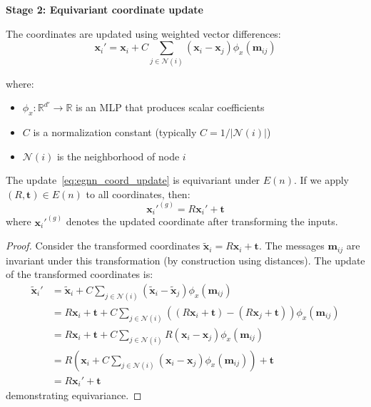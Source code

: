 \textbf{Stage 2: Equivariant coordinate update}

The coordinates are updated using weighted vector differences:
\begin{equation}\label{eq:egnn_coord_update}
\mathbf{x}_i' = \mathbf{x}_i + C \sum_{j \in \mathcal{N}(i)} (\mathbf{x}_i - \mathbf{x}_j) \phi_x(\mathbf{m}_{ij})
\end{equation}

where:
\begin{itemize}
    \item $\phi_x: \mathbb{R}^{d'} \to \mathbb{R}$ is an MLP that produces scalar coefficients
    \item $C$ is a normalization constant (typically $C = 1/|\mathcal{N}(i)|$)
    \item $\mathcal{N}(i)$ is the neighborhood of node $i$
\end{itemize}

\begin{proposition}\label{prop:egnn_coord_equivariance}
The update~\eqref{eq:egnn_coord_update} is equivariant under $E(n)$. If we apply $(R, \mathbf{t}) \in E(n)$ to all coordinates, then:
\begin{equation}
\mathbf{x}_i'^{(g)} = R\mathbf{x}_i' + \mathbf{t}
\end{equation}
where $\mathbf{x}_i'^{(g)}$ denotes the updated coordinate after transforming the inputs.
\end{proposition}

\begin{proof}
Consider the transformed coordinates $\tilde{\mathbf{x}}_i = R\mathbf{x}_i + \mathbf{t}$. The messages $\mathbf{m}_{ij}$ are invariant under this transformation (by construction using distances). The update of the transformed coordinates is:
\begin{align}
\tilde{\mathbf{x}}_i' &= \tilde{\mathbf{x}}_i + C \sum_{j \in \mathcal{N}(i)} (\tilde{\mathbf{x}}_i - \tilde{\mathbf{x}}_j) \phi_x(\mathbf{m}_{ij}) \\
&= R\mathbf{x}_i + \mathbf{t} + C \sum_{j \in \mathcal{N}(i)} ((R\mathbf{x}_i + \mathbf{t}) - (R\mathbf{x}_j + \mathbf{t})) \phi_x(\mathbf{m}_{ij}) \\
&= R\mathbf{x}_i + \mathbf{t} + C \sum_{j \in \mathcal{N}(i)} R(\mathbf{x}_i - \mathbf{x}_j) \phi_x(\mathbf{m}_{ij}) \\
&= R\left(\mathbf{x}_i + C \sum_{j \in \mathcal{N}(i)} (\mathbf{x}_i - \mathbf{x}_j) \phi_x(\mathbf{m}_{ij})\right) + \mathbf{t} \\
&= R\mathbf{x}_i' + \mathbf{t}
\end{align}
demonstrating equivariance.
\end{proof}

